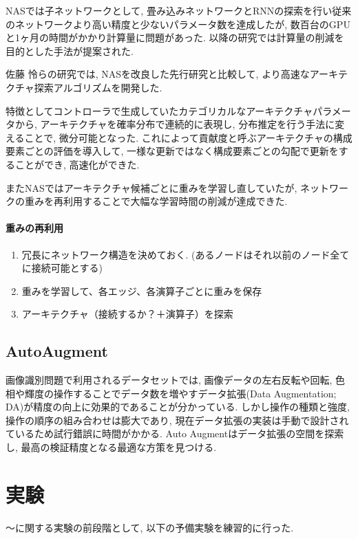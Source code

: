 \documentclass[twocolumn]{jarticle}     %
\begin{document}
NASでは子ネットワークとして, 畳み込みネットワークとRNNの探索を行い従来のネットワークより高い精度と少ないパラメータ数を達成したが, 数百台のGPUと1ヶ月の時間がかかり計算量に問題があった.
以降の研究では計算量の削減を目的とした手法が提案された.

佐藤 怜ら\cite{ANAS}の研究では, NASを改良した先行研究と比較して, より高速なアーキテクチャ探索アルゴリズムを開発した.

特徴としてコントローラで生成していたカテゴリカルなアーキテクチャパラメータから,
アーキテクチャを確率分布で連続的に表現し, 分布推定を行う手法に変えることで, 微分可能となった.
これによって貢献度と呼ぶアーキテクチャの構成要素ごとの評価を導入して, 一様な更新ではなく構成要素ごとの勾配で更新をすることができ, 高速化ができた.

またNASではアーキテクチャ候補ごとに重みを学習し直していたが, ネットワークの重みを再利用することで大幅な学習時間の削減が達成できた.

\paragraph{重みの再利用}
\begin{enumerate}
  \item 冗長にネットワーク構造を決めておく. (あるノードはそれ以前のノード全てに接続可能とする)
  \item 重みを学習して、各エッジ、各演算子ごとに重みを保存
  \item アーキテクチャ（接続するか？＋演算子）を探索
\end{enumerate}


\subsection{AutoAugment}

画像識別問題で利用されるデータセットでは, 画像データの左右反転や回転, 色相や輝度の操作することでデータ数を増やすデータ拡張(Data Augmentation; DA)が精度の向上に効果的であることが分かっている.
しかし操作の種類と強度, 操作の順序の組み合わせは膨大であり, 現在データ拡張の実装は手動で設計されているため試行錯誤に時間がかかる.
Auto Augment\cite{DBLP:journals/corr/abs-1805-09501}はデータ拡張の空間を探索し, 最高の検証精度となる最適な方策を見つける.

\section{実験}
～に関する実験の前段階として, 以下の予備実験を練習的に行った.
\end{document}
